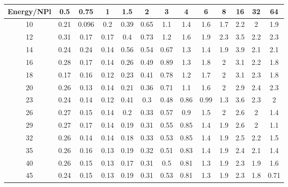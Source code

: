 \begin{tabular}{c c c c c c c c c c c c c}
\hline
\hline
 Energy/NPl &    0.5 &   0.75 &      1 &    1.5 &      2 &      3 &      4 &      6 &      8 &     16 &     32 &     64  \\ 
\hline
    10  &   0.21  &  0.096  &    0.2  &   0.39  &   0.65  &    1.1  &    1.4  &    1.6  &    1.7  &    2.2  &      2  &    1.9  \\
    12  &   0.31  &   0.17  &   0.17  &    0.4  &   0.73  &    1.2  &    1.6  &    1.9  &    2.3  &    3.5  &    2.2  &    2.3  \\
    14  &   0.24  &   0.24  &   0.14  &   0.56  &   0.54  &   0.67  &    1.3  &    1.4  &    1.9  &    3.9  &    2.1  &    2.1  \\
    16  &   0.28  &   0.17  &   0.14  &   0.26  &   0.49  &   0.89  &    1.3  &    1.8  &      2  &    3.1  &    2.2  &    1.8  \\
    18  &   0.17  &   0.16  &   0.12  &   0.23  &   0.41  &   0.78  &    1.2  &    1.7  &      2  &    3.1  &    2.3  &    1.8  \\
    20  &   0.26  &   0.13  &   0.14  &   0.21  &   0.36  &   0.71  &    1.1  &    1.6  &      2  &    2.9  &    2.4  &    2.3  \\
    23  &   0.24  &   0.14  &   0.12  &   0.41  &    0.3  &   0.48  &   0.86  &   0.99  &    1.3  &    3.6  &    2.3  &      2  \\
    26  &   0.27  &   0.15  &   0.14  &    0.2  &   0.33  &   0.57  &    0.9  &    1.5  &      2  &    2.6  &      2  &    1.4  \\
    29  &   0.27  &   0.17  &   0.14  &   0.19  &   0.31  &   0.55  &   0.85  &    1.4  &    1.9  &    2.6  &      2  &    1.1  \\
    32  &   0.26  &   0.14  &   0.14  &   0.18  &   0.33  &   0.53  &   0.85  &    1.4  &    1.9  &    2.5  &    2.2  &    1.5  \\
    35  &   0.26  &   0.16  &   0.13  &   0.19  &   0.32  &   0.51  &   0.83  &    1.4  &    1.9  &    2.4  &    2.1  &    1.4  \\
    40  &   0.26  &   0.15  &   0.13  &   0.17  &   0.31  &    0.5  &   0.81  &    1.3  &    1.9  &    2.3  &    1.9  &    1.6  \\
    45  &   0.24  &   0.15  &   0.13  &   0.19  &   0.31  &   0.53  &   0.81  &    1.3  &    1.9  &    2.3  &    1.8  &   0.71  \\
\hline
\hline
\end{tabular}
